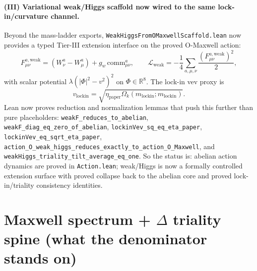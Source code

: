 \documentclass[11pt]{article}
\begin{document}
\paragraph{(III) Variational weak/Higgs scaffold now wired to the same lock-in/curvature channel.}
Beyond the mass-ladder exports, \texttt{WeakHiggsFromOMaxwellScaffold.lean} now provides a typed Tier-III
extension interface on the proved O-Maxwell action:
\[
  F^{a,\mathrm{weak}}_{\mu\nu}
  =
  (W^a_\nu-W^a_\mu)+g_w\,\mathrm{comm}^a_{\mu\nu},
  \qquad
  \mathcal{L}_{\mathrm{weak}}
  =-\frac14\sum_{a,\mu,\nu}\frac{(F^{a,\mathrm{weak}}_{\mu\nu})^2}{2},
\]
with scalar potential \(\lambda(|\Phi|^2-v^2)^2\) on \(\Phi\in\mathbb{R}^8\). The lock-in vev proxy is
\[
  v_{\mathrm{lockin}}=\sqrt{\eta_{\mathrm{paper}}\Omega_k(m_{\mathrm{lockin}};m_{\mathrm{lockin}})}.
\]
Lean now proves reduction and normalization lemmas that push this further than pure placeholders:
\texttt{weakF\_reduces\_to\_abelian}, \texttt{weakF\_diag\_eq\_zero\_of\_abelian},
\texttt{lockinVev\_sq\_eq\_eta\_paper}, \texttt{lockinVev\_eq\_sqrt\_eta\_paper},
\texttt{action\_O\_weak\_higgs\_reduces\_exactly\_to\_action\_O\_Maxwell}, and
\texttt{weakHiggs\_triality\_tilt\_average\_eq\_one}.
So the status is: abelian action dynamics are proved in \texttt{Action.lean}; weak/Higgs is now a
formally controlled extension surface with proved collapse back to the abelian core and proved lock-in/triality consistency identities.

\section{Maxwell spectrum + \texorpdfstring{$\Delta$}{Delta} triality spine (what the denominator stands on)}
\label{sec:maxwell-delta-triality}
\end{document}
